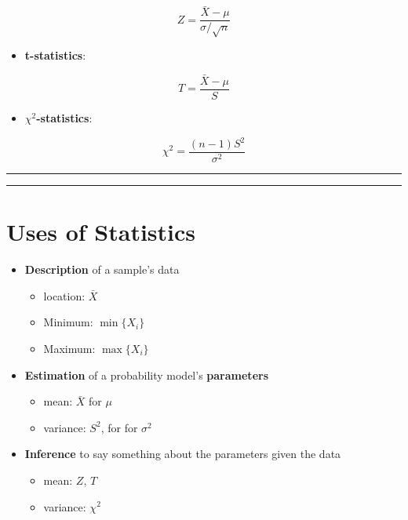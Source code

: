 \documentclass[
]{book}
\providecommand{\tightlist}{%
  \setlength{\itemsep}{0pt}\setlength{\parskip}{0pt}}
\begin{document}
\[Z=\frac{\bar{X}-\mu}{\sigma/\sqrt{n}}\]

\begin{itemize}
\tightlist
\item
  \textbf{t-statistics}:
\end{itemize}

\[T=\frac{\bar{X}-\mu}{S}\]

\begin{itemize}
\tightlist
\item
  \textbf{\(\chi^2\)-statistics}:
\end{itemize}

\[\chi^2=\frac{(n-1)S^2}{\sigma^2}\]

\begin{center}\rule{0.5\linewidth}{0.5pt}\end{center}

\begin{center}\rule{0.5\linewidth}{0.5pt}\end{center}

\hypertarget{uses-of-statistics}{%
\section{Uses of Statistics}\label{uses-of-statistics}}

\begin{itemize}
\item
  \textbf{Description} of a sample's data

  \begin{itemize}
  \tightlist
  \item
    location: \(\bar{X}\)
  \item
    Minimum: \(\min\{X_i\}\)
  \item
    Maximum: \(\max\{X_i\}\)
  \end{itemize}
\item
  \textbf{Estimation} of a probability model's \textbf{parameters}

  \begin{itemize}
  \tightlist
  \item
    mean: \(\bar{X}\) for \(\mu\)
  \item
    variance: \(S^2\), for for \(\sigma^2\)
  \end{itemize}
\item
  \textbf{Inference} to say something about the parameters given the data

  \begin{itemize}
  \tightlist
  \item
    mean: \(Z\), \(T\)
  \item
    variance: \(\chi^2\)
  \end{itemize}
\end{itemize}
\end{document}
